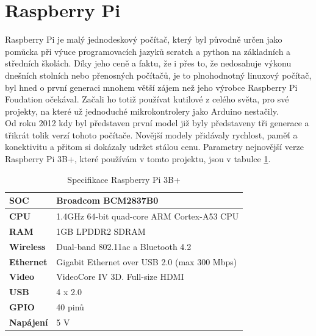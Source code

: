 \documentclass{ctuthesis}
\begin{document}
\section{Raspberry Pi}
Raspberry Pi je malý jednodeskový počítač, který byl původně určen jako pomůcka při výuce programovacích jazyků scratch a python na základních a středních školách. Díky jeho ceně a faktu, že i přes to, že nedosahuje výkonu dnešních stolních nebo přenosných počítačů, je to plnohodnotný linuxový počítač, byl hned o první generaci mnohem větší zájem než jeho výrobce Raspberry Pi Foudation očekával. Začali ho totiž používat kutilové z celého světa, pro své projekty, na které už jednoduché mikrokontrolery jako Arduino nestačily. \cite{opensource} \\
Od roku 2012 kdy byl představen první model \cite{conorlyons2015} již byly představeny tři generace a třikrát tolik verzí tohoto počítače. Novější modely přidávaly rychlost, paměť a konektivitu a přitom si dokázaly udržet stálou cenu. Parametry nejnovější verze Raspberry Pi 3B+, které používám v tomto projektu, jsou v tabulce \ref{tab:pi}.
\begin{table}[]
\begin{ctucolortab}
\begin{tabular}{|l|l|}
\hline
\textbf{SOC}      & Broadcom BCM2837B0                  \\ \hline
\textbf{CPU}      & 1.4GHz 64-bit quad-core ARM Cortex-A53 CPU                           \\ \hline
\textbf{RAM}      & 1GB LPDDR2 SDRAM                                                     \\ \hline
\textbf{Wireless} & Dual-band 802.11ac a Bluetooth 4.2 \\ \hline
\textbf{Ethernet} & Gigabit Ethernet over USB 2.0 (max 300 Mbps)                         \\ \hline
\textbf{Video}    & VideoCore IV 3D. Full-size HDMI                                      \\ \hline
\textbf{USB}      & 4 x 2.0                                                              \\ \hline
\textbf{GPIO}     & 40 pinů                                                              \\ \hline
\textbf{Napájení} & 5 V                                                                  \\ \hline
\end{tabular}
\caption{Specifikace Raspberry Pi 3B+ \cite{conorlyons2015}}
\label{tab:pi}
\end{ctucolortab}
\end{table}
\end{document}
